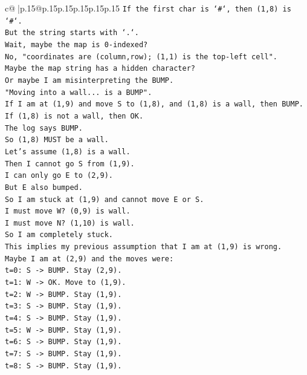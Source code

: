 \documentclass{article}
\begin{document}
{\begin{supertabular}{c@{$\;$}|p{.15\linewidth}@{}p{.15\linewidth}p{.15\linewidth}p{.15\linewidth}p{.15\linewidth}p{.15\linewidth}}
{{{\texttt{If the first char is `\#`, then (1,8) is `\#`.} \\
\texttt{But the string starts with `.`.} \\
\texttt{Wait, maybe the map is 0{-}indexed?} \\
\texttt{No, "coordinates are (column,row); (1,1) is the top{-}left cell".} \\
\texttt{Maybe the map string has a hidden character?} \\
\texttt{Or maybe I am misinterpreting the BUMP.} \\
\texttt{"Moving into a wall... is a BUMP".} \\
\texttt{If I am at (1,9) and move S to (1,8), and (1,8) is a wall, then BUMP.} \\
\texttt{If (1,8) is not a wall, then OK.} \\
\texttt{The log says BUMP.} \\
\texttt{So (1,8) MUST be a wall.} \\
\texttt{Let's assume (1,8) is a wall.} \\
\texttt{Then I cannot go S from (1,9).} \\
\texttt{I can only go E to (2,9).} \\
\texttt{But E also bumped.} \\
\texttt{So I am stuck at (1,9) and cannot move E or S.} \\
\texttt{I must move W? (0,9) is wall.} \\
\texttt{I must move N? (1,10) is wall.} \\
\texttt{So I am completely stuck.} \\
\texttt{This implies my previous assumption that I am at (1,9) is wrong.} \\
\texttt{Maybe I am at (2,9) and the moves were:} \\
\texttt{t=0: S {-}> BUMP. Stay (2,9).} \\
\texttt{t=1: W {-}> OK. Move to (1,9).} \\
\texttt{t=2: W {-}> BUMP. Stay (1,9).} \\
\texttt{t=3: S {-}> BUMP. Stay (1,9).} \\
\texttt{t=4: S {-}> BUMP. Stay (1,9).} \\
\texttt{t=5: W {-}> BUMP. Stay (1,9).} \\
\texttt{t=6: S {-}> BUMP. Stay (1,9).} \\
\texttt{t=7: S {-}> BUMP. Stay (1,9).} \\
\texttt{t=8: S {-}> BUMP. Stay (1,9).} \\
}}}
\end{supertabular}}
\end{document}
